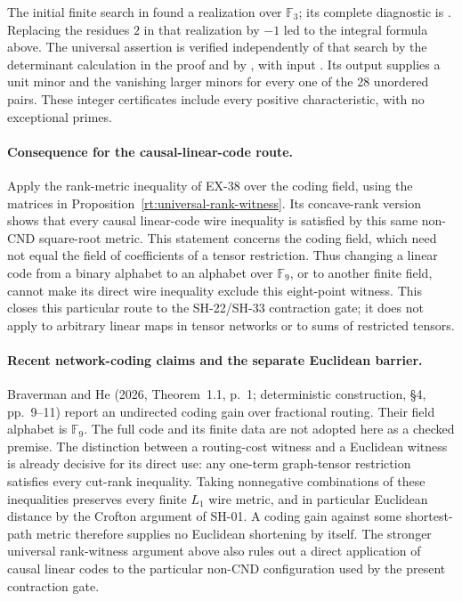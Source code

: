 The initial finite search in
 found a realization
over $\mathbb F_3$; its complete diagnostic is
. Replacing the residues
$2$ in that realization by $-1$ led to the integral formula
above. The universal assertion is verified independently of
that search by the determinant calculation in the proof and by
, with input
. Its output
 supplies a unit
minor and the vanishing larger minors for every one of the
28 unordered pairs. These integer certificates include every
positive characteristic, with no exceptional primes.

\paragraph{Consequence for the causal-linear-code route.}
Apply the rank-metric inequality of EX-38 over the coding
field, using the matrices in Proposition~\ref{rt:universal-rank-witness}.
Its concave-rank version shows that every causal linear-code
wire inequality is satisfied by this same non-CND square-root
metric. This statement concerns the coding field, which need
not equal the field of coefficients of a tensor restriction.
Thus changing a linear code from a binary alphabet to an
alphabet over $\mathbb F_9$, or to another finite field, cannot
make its direct wire inequality exclude this eight-point
witness. This closes this particular route to the SH-22/SH-33
contraction gate; it does not apply to arbitrary linear maps
in tensor networks or to sums of restricted tensors.

\paragraph{Recent network-coding claims and the separate Euclidean barrier.}
Braverman and He (2026, Theorem~1.1, p.~1; deterministic
construction, \S4, pp.~9--11) report an undirected coding gain
over fractional routing. Their field alphabet is $\mathbb F_9$.
The full code and its finite data are not adopted here as a
checked premise. The distinction between a routing-cost
witness and a Euclidean witness is already decisive for its
direct use: any one-term graph-tensor restriction satisfies
every cut-rank inequality. Taking nonnegative combinations of
these inequalities preserves every finite $L_1$ wire metric,
and in particular Euclidean distance by the Crofton argument
of SH-01. A coding gain against some shortest-path metric
therefore supplies no Euclidean shortening by itself. The
stronger universal rank-witness argument above also rules out
a direct application of causal linear codes to the particular
non-CND configuration used by the present contraction gate.


